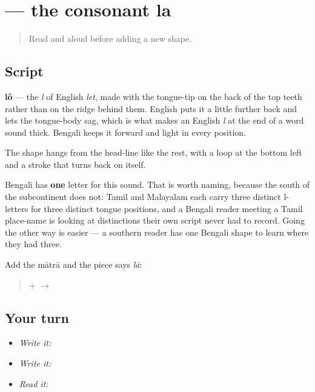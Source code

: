 \section[\texorpdfstring{\bn{ল} (lô)}{ল (lô)}]{ — the consonant la}

\label{lesson:BN-W02-la}



\begin{quote}
Read \textbf{} and \textbf{} aloud before adding a new shape.
\end{quote}

\subsection*{Script}

\begin{quote}
\end{quote}

\textbf{lô} — the \emph{l} of English \emph{let}, made with the tongue-tip on the back of the top teeth rather than on the ridge behind them. English puts it a little further back and lets the tongue-body sag, which is what makes an English \emph{l} at the end of a word sound thick. Bengali keeps it forward and light in every position.

The shape hangs from the head-line like the rest, with a loop at the bottom left and a stroke that turns back on itself.

Bengali has \textbf{one} letter for this sound. That is worth naming, because the south of the subcontinent does not: Tamil and Malayalam each carry three distinct l-letters for three distinct tongue positions, and a Bengali reader meeting a Tamil place-name is looking at distinctions their own script never had to record. Going the other way is easier — a southern reader has one Bengali shape to learn where they had three.

Add the mātrā and the piece says \emph{lā}:

\begin{quote}
\textbf{} + \textbf{} $\to$ \textbf{}
\end{quote}

\subsection*{Your turn}
\begin{itemize}
\raggedright
  \item \emph{Write it:} 
  \item \emph{Write it:} 
  \item \emph{Read it:} 
\end{itemize}

